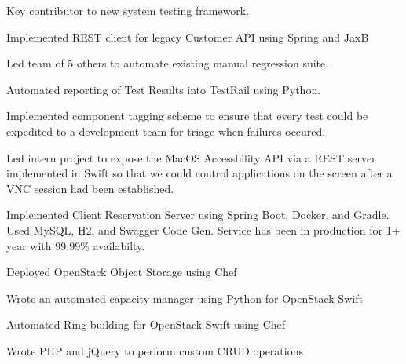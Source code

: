 \documentclass[letterpaper]{resume} %
\begin{document}
\begin{minipage}[t]{0.66\textwidth}
\begin{tightitemize}
\item Key contributor to new system testing framework.
\item Implemented REST client for legacy Customer API using Spring and JaxB
\item Led team of 5 others to automate existing manual regression suite.
\item Automated reporting of Test Results into TestRail using Python.
\item Implemented component tagging scheme to ensure that every test could be expedited to a development team for triage when failures occured.
\item Led intern project to expose the MacOS Accessbility API via a REST server implemented in Swift so that we could control applications on the screen after a VNC session had been established.
\item Implemented Client Reservation Server using Spring Boot, Docker, and Gradle.  Used MySQL, H2, and Swagger Code Gen.  Service has been in production for 1+ year with 99.99\% availabilty.
\end{tightitemize}

\sectionspace %

\begin{tightitemize}
\item Deployed OpenStack Object Storage using Chef
\item Wrote an automated capacity manager using Python for OpenStack Swift
\item Automated Ring building for OpenStack Swift using Chef
\end{tightitemize}

\sectionspace %



\begin{tightitemize}
\item Wrote PHP and jQuery to perform custom CRUD operations
\end{tightitemize}


\end{minipage}
\end{document}
